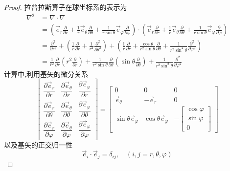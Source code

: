 \begin{proof}
	拉普拉斯算子在球坐标系的表示为
	\begin{equation*}
		\begin{split}
			\nabla ^2&=\nabla \cdot \nabla \\
			&=(\vec{e}_{r} \frac{\partial}{\partial r}+\frac{1}{r} \vec{e}_{\theta} \frac{\partial}{\partial \theta}+\frac{1}{r \sin \theta} \vec{e}_{\varphi} \frac{\partial}{\partial \varphi})  \cdot (\vec{e}_{r} \frac{\partial}{\partial r}+\frac{1}{r} \vec{e}_{\theta} \frac{\partial}{\partial \theta}+\frac{1}{r \sin \theta} \vec{e}_{\varphi} \frac{\partial}{\partial \varphi}) \\
			&=\frac{\partial ^2}{\partial r^2} + ( \frac{1}{r} \frac{\partial}{\partial r} + \frac{1}{r^2} \frac{\partial^2} {\partial \theta ^2}  ) + (\frac{1}{r} \frac{\partial}{\partial r}  + \frac{\cos \theta}{r^2 \sin \theta} \frac{\partial} {\partial \theta }  + \frac{1}{r^2 \sin^2 \theta  } \frac{\partial^2}{\partial\varphi ^2} )\\
			&=\frac{1}{r^2} \frac{\partial }{\partial r} (r^2\frac{\partial }{\partial r} )+
			\frac{1}{r^2 \sin \theta  } \frac{\partial }{\partial \theta } (\sin \theta \frac{\partial }{\partial \theta } )
			+\frac{1}{r^2 \sin^2 \theta  } \frac{\partial^2}{\partial\varphi ^2}
		\end{split}
		\end{equation*}	
	计算中,利用基矢的微分关系
	$$\left[\begin{array}{ccc}
		\dfrac{\partial \vec{e}_{r}}{\partial r} & \dfrac{\partial \vec{e}_{\theta}}{\partial r} & \dfrac{\partial \vec{e}_{\varphi}}{\partial r}\\ 
		\dfrac{\partial \vec{e}_{r}}{\partial \theta} & \dfrac{\partial \vec{e}_{\theta}}{\partial \theta} & \dfrac{\partial \vec{e}_{\varphi}}{\partial \theta}  \\ 
		\dfrac{\partial \vec{e}_{r}}{\partial \varphi} & \dfrac{\partial \vec{e}_{\theta}}{\partial \varphi} & \dfrac{\partial \vec{e}_{\varphi}}{\partial \varphi} 
	\end{array}\right]
	= \left[\begin{array}{ccc}
		0 & 0 & 0 \\ 
		\vec{e}_{\theta} & -\vec{e}_{r}  & 0\\ 
		\sin \theta \vec{e}_{\varphi} & \cos \theta \vec{e}_{\varphi} & -\left[\begin{array}{c} \cos \varphi \\ \sin \varphi \\ 0\end{array}\right] 
	\end{array}\right]
	$$
	以及基矢的正交归一性
	\begin{equation*}
		\vec{e}_{i} \cdot \vec{e}_{j} = \delta_{ij}, \quad (i,j = r,\theta, \varphi )
	\end{equation*}
\end{proof}


